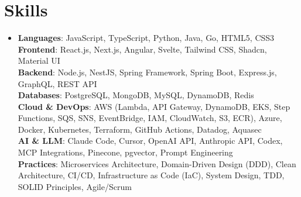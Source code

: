 \section{Skills}
  \begin{itemize}[leftmargin=0.15in, label={}]
    \item\small{
      \textbf{Languages}: JavaScript, TypeScript, Python, Java, Go, HTML5, CSS3 \\
      \textbf{Frontend}: React.js, Next.js, Angular, Svelte, Tailwind CSS, Shadcn, Material UI \\
      \textbf{Backend}: Node.js, NestJS, Spring Framework, Spring Boot, Express.js, GraphQL, REST API \\
      \textbf{Databases}: PostgreSQL, MongoDB, MySQL, DynamoDB, Redis \\
      \textbf{Cloud \& DevOps}: AWS (Lambda, API Gateway, DynamoDB, EKS, Step Functions, SQS, SNS, EventBridge, IAM, CloudWatch, S3, ECR), Azure, Docker, Kubernetes, Terraform, GitHub Actions, Datadog, Aquasec \\
      \textbf{AI \& LLM}: Claude Code, Cursor, OpenAI API, Anthropic API, Codex, MCP Integrations, Pinecone, pgvector, Prompt Engineering \\
      \textbf{Practices}: Microservices Architecture, Domain-Driven Design (DDD), Clean Architecture, CI/CD, Infrastructure as Code (IaC), System Design, TDD, SOLID Principles, Agile/Scrum
    }
  \end{itemize}
